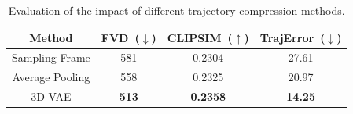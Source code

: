 \begin{table}[!t]\footnotesize
\centering
\renewcommand{\arraystretch}{1.1}
\begin{tabular}{cccc}
    \toprule
    Method             & FVD~($\downarrow$) & CLIPSIM~($\uparrow$) & TrajError~($\downarrow$) \\ \midrule
    Sampling Frame &  581   &  0.2304       &    27.61              \\
    Average Pooling    &  558   &  0.2325    &          20.97       \\
    3D VAE             &  \textbf{513}   &  \textbf{0.2358}       &   \textbf{14.25}               \\ 
    \bottomrule
\end{tabular}
\caption{Evaluation of the impact of different trajectory compression methods.} 
\vspace{-3mm}
\label{tab2}
\end{table}


